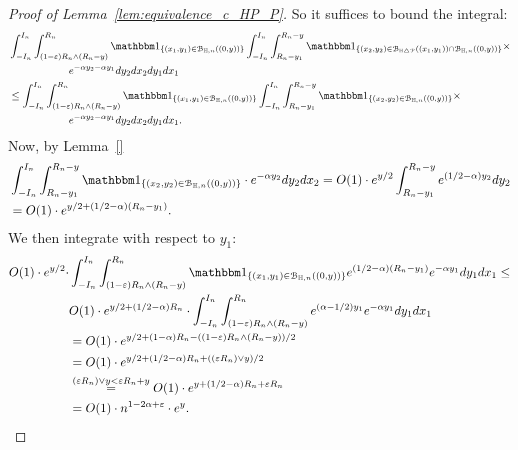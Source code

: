 \begin{proof}[Proof of Lemma~\ref{lem:equivalence_c_HP_P}]
So it suffices to bound the integral: 
\begin{equation}
\begin{split}
&\int_{-I_n}^{I_n} \int_{(1-\eps) R_n \wedge (R_n-y)}^{R_n} \ind{(x_1,y_1) \in \BallHyp{(0,y)}}
\int_{-I_n}^{I_n} \int_{R_n - y_1}^{R_n - y} 
\ind{(x_2,y_2) \in \BallSym{(x_1,y_1)} \cap \BallHyp{(0,y)}} \times \\ 
& \hspace{2cm}  e^{-\alpha y_2 - \alpha y_1} dy_2 dx_2 dy_1 dx_1 \\
&\leq \int_{-I_n}^{I_n} \int_{(1-\eps) R_n \wedge (R_n-y)}^{R_n} \ind{(x_1,y_1) \in \BallHyp{(0,y)}}
\int_{-I_n}^{I_n} \int_{R_n - y_1}^{R_n - y} 
\ind{(x_2,y_2) \in  \BallHyp{(0,y)}} \times \\ 
& \hspace{2cm}  e^{-\alpha y_2 - \alpha y_1} dy_2 dx_2 dy_1 dx_1.
\end{split}
\end{equation}
Now, by Lemma~\ref{}
\begin{equation*}
\begin{split}
&\int_{-I_n}^{I_n} \int_{R_n - y_1}^{R_n - y} \ind{(x_2,y_2) \in  \BallHyp{(0,y)}} \cdot  
e^{-\alpha y_2} dy_2 dx_2 = O(1) \cdot e^{y/2} \int_{R_n - y_1}^{R_n - y} e^{(1/2 - \alpha) y_2} dy_2 \\
&= O(1) \cdot e^{y/2 + (1/2 - \alpha) (R_n - y_1)}.
\end{split}
\end{equation*}
We then integrate with respect to $y_1$:
\begin{equation*}
\begin{split} O(1) \cdot e^{y/2} \cdot 
&\int_{-I_n}^{I_n} \int_{(1-\eps) R_n \wedge (R_n-y)}^{R_n} \ind{(x_1,y_1) \in \BallHyp{(0,y)}} 
e^{(1/2 - \alpha) (R_n - y_1)} e^{-\alpha y_1} dy_1dx_1 \leq \\
& O(1) \cdot e^{y/2 + (1/2 -\alpha) R_n} \cdot \int_{-I_n}^{I_n} \int_{(1-\eps) R_n \wedge (R_n-y)}^{R_n} 
e^{(\alpha -1/2) y_1} e^{-\alpha y_1} dy_1dx_1 \\
&=O(1) \cdot e^{y/2 + (1 -\alpha) R_n -((1-\eps) R_n \wedge (R_n-y))/2} \\
&=O(1) \cdot e^{y/2 + (1/2 -\alpha) R_n + ((\eps R_n) \vee y)/2}\\
&\stackrel{(\eps R_n) \vee y < \eps R_n + y}{=}O(1) \cdot e^{y + (1/2 -\alpha) R_n + \eps R_n}\\
&= O(1) \cdot n^{1- 2\alpha+ \eps} \cdot e^{y}. 
\end{split}
\end{equation*}



\end{proof}
